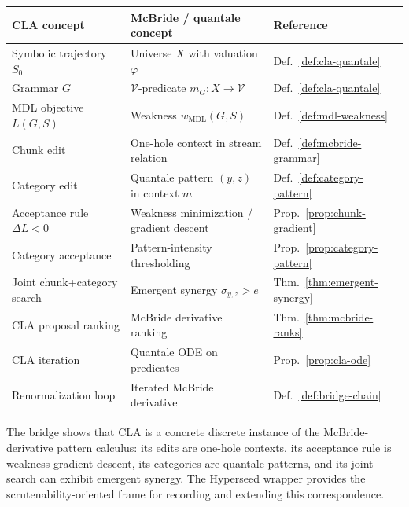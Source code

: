 \documentclass[11pt]{article}
\begin{document}
\begin{center}
\begin{tabular}{lll}
\hline
\textbf{CLA concept} & \textbf{McBride / quantale concept} & \textbf{Reference} \\
\hline
Symbolic trajectory $S_0$ & Universe $X$ with valuation $\varphi$ & Def.~\ref{def:cla-quantale} \\
Grammar $G$ & $\mathcal{V}$-predicate $m_G : X \to \mathcal{V}$ & Def.~\ref{def:cla-quantale} \\
MDL objective $L(G, S)$ & Weakness $w_{\text{MDL}}(G, S)$ & Def.~\ref{def:mdl-weakness} \\
Chunk edit & One-hole context in stream relation & Def.~\ref{def:mcbride-grammar} \\
Category edit & Quantale pattern $(y, z)$ in context $m$ & Def.~\ref{def:category-pattern} \\
Acceptance rule $\Delta L < 0$ & Weakness minimization / gradient descent & Prop.~\ref{prop:chunk-gradient} \\
Category acceptance & Pattern-intensity thresholding & Prop.~\ref{prop:category-pattern} \\
Joint chunk+category search & Emergent synergy $\sigma_{y,z} > e$ & Thm.~\ref{thm:emergent-synergy} \\
CLA proposal ranking & McBride derivative ranking & Thm.~\ref{thm:mcbride-ranks} \\
CLA iteration & Quantale ODE on predicates & Prop.~\ref{prop:cla-ode} \\
Renormalization loop & Iterated McBride derivative & Def.~\ref{def:bridge-chain} \\
\hline
\end{tabular}
\end{center}

The bridge shows that CLA is a concrete discrete instance of the McBride-derivative pattern calculus: its edits are one-hole contexts, its acceptance rule is weakness gradient descent, its categories are quantale patterns, and its joint search can exhibit emergent synergy.  The Hyperseed wrapper provides the scrutenability-oriented frame for recording and extending this correspondence.
\end{document}

